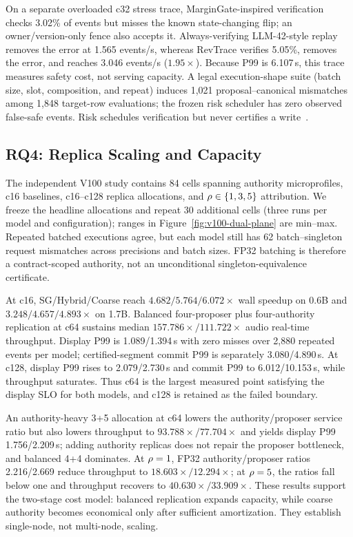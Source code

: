 
On a separate overloaded c32 stress trace, MarginGate-inspired verification
checks 3.02\% of events but misses the known state-changing flip; an
owner/version-only fence also accepts it. Always-verifying LLM-42-style replay
removes the error at 1.565 events/s, whereas RevTrace verifies 5.05\%, removes
the error, and reaches 3.046 events/s ($1.95\times$). Because P99 is
6.107\,s, this trace measures safety cost, not serving capacity. A legal
execution-shape suite (batch size, slot, composition, and repeat) induces
1{,}021 proposal--canonical mismatches among 1{,}848 target-row evaluations;
the frozen risk scheduler has zero observed false-safe events. Risk schedules
verification but never certifies a write~\cite{chu2026margingate,zhang2026llm42}.

\subsection{RQ4: Replica Scaling and Capacity}\label{sec:eval:rq4}

The independent V100 study contains 84 cells spanning authority
microprofiles, c16 baselines, c16--c128 replica allocations, and
$\rho\in\{1,3,5\}$ attribution. We freeze the headline allocations and
repeat 30 additional cells (three runs per model and configuration); ranges in
Figure~\ref{fig:v100-dual-plane} are min--max. Repeated batched executions
agree, but each model still has 62 batch--singleton request mismatches across
precisions and batch sizes. FP32 batching is therefore a contract-scoped
authority, not an unconditional singleton-equivalence certificate.

At c16, SG/Hybrid/Coarse reach $4.682/5.764/6.072\times$ wall speedup on
0.6B and $3.248/4.657/4.893\times$ on 1.7B. Balanced four-proposer plus
four-authority replication at c64 sustains median $157.786\times/111.722\times$
audio real-time throughput. Display P99 is 1.089/1.394\,s with zero misses
over 2{,}880 repeated events per model; certified-segment commit P99 is
separately 3.080/4.890\,s. At c128, display P99 rises to 2.079/2.730\,s and
commit P99 to 6.012/10.153\,s, while throughput saturates. Thus c64 is the
largest measured point satisfying the display SLO for both models, and c128 is
retained as the failed boundary.

An authority-heavy 3+5 allocation at c64 lowers the authority/proposer service
ratio but also lowers throughput to $93.788\times/77.704\times$ and yields
display P99 1.756/2.209\,s; adding authority replicas does not repair the
proposer bottleneck, and balanced 4+4 dominates. At
$\rho=1$, FP32 authority/proposer ratios 2.216/2.669 reduce throughput to
$18.603\times/12.294\times$; at $\rho=5$, the ratios fall below one and
throughput recovers to $40.630\times/33.909\times$. These results support the
two-stage cost model: balanced replication expands capacity, while coarse
authority becomes economical only after sufficient amortization. They
establish single-node, not multi-node, scaling.

